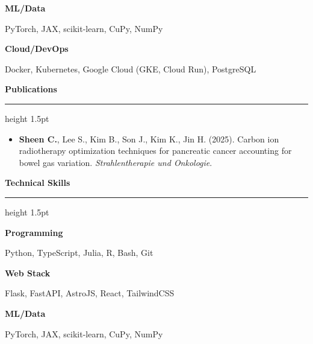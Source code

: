 \documentclass[11pt,a4paper]{article}
\newcommand{\cvsection}[1]{%
  \vspace{1em}
  {\color{sectioncolor}\Large\bfseries #1}
  \vspace{0.2em}
  {\color{sectioncolor}\hrule height 1.5pt}
  \vspace{0.5em}
}
\begin{document}
\vspace{0.3em}
\noindent
\begin{minipage}[t]{3.5cm}
\textbf{\color{accentcolor}ML/Data}
\end{minipage}%
\begin{minipage}[t]{12cm}
PyTorch, JAX, scikit-learn, CuPy, NumPy
\end{minipage}

\vspace{0.3em}
\noindent
\begin{minipage}[t]{3.5cm}
\textbf{\color{accentcolor}Cloud/DevOps}
\end{minipage}%
\begin{minipage}[t]{12cm}
Docker, Kubernetes, Google Cloud (GKE, Cloud Run), PostgreSQL
\end{minipage}

\cvsection{Publications}
\begin{itemize}[leftmargin=1.5em, itemsep=0.3em]
  \item \textbf{Sheen C.}, Lee S., Kim B., Son J., Kim K., Jin H. (2025). Carbon ion radiotherapy optimization techniques for pancreatic cancer accounting for bowel gas variation. \emph{Strahlentherapie und Onkologie}.
\end{itemize}


\cvsection{Technical Skills}
\noindent
\begin{minipage}[t]{3.5cm}
\textbf{\color{accentcolor}Programming}
\end{minipage}%
\begin{minipage}[t]{12cm}
Python, TypeScript, Julia, R, Bash, Git
\end{minipage}

\vspace{0.3em}
\noindent
\begin{minipage}[t]{3.5cm}
\textbf{\color{accentcolor}Web Stack}
\end{minipage}%
\begin{minipage}[t]{12cm}
Flask, FastAPI, AstroJS, React, TailwindCSS
\end{minipage}

\vspace{0.3em}
\noindent
\begin{minipage}[t]{3.5cm}
\textbf{\color{accentcolor}ML/Data}
\end{minipage}%
\begin{minipage}[t]{12cm}
PyTorch, JAX, scikit-learn, CuPy, NumPy
\end{minipage}
\end{document}
